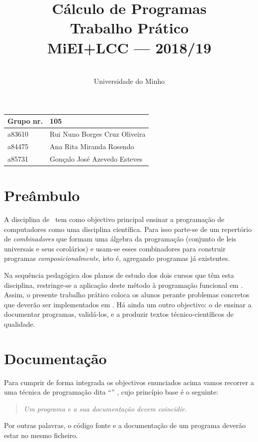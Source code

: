 \documentclass[a4paper]{article}
\title{
       	    Cálculo de Programas
\\
       	Trabalho Prático
\\
       	MiEI+LCC --- 2018/19
}
\author{
       	\dium
\\
       	Universidade do Minho
}
\date\mydate
\begin{document}
\maketitle

\begin{center}\large
\begin{tabular}{ll}
\textbf{Grupo} nr. & 105
\\\hline
a83610 & Rui Nuno Borges Cruz Oliveira	
\\
a84475 & Ana Rita Miranda Rosendo 
\\
a85731 & Gonçalo José Azevedo Esteves 
\end{tabular}
\end{center}

\section{Preâmbulo}

A disciplina de \CP\ tem como objectivo principal ensinar
a progra\-mação de computadores como uma disciplina científica. Para isso
parte-se de um repertório de \emph{combinadores} que formam uma álgebra da
programação (conjunto de leis universais e seus corolários) e usam-se esses
combinadores para construir programas \emph{composicionalmente}, isto é,
agregando programas já existentes.
  
Na sequência pedagógica dos planos de estudo dos dois cursos que têm
esta disciplina, restringe-se a aplicação deste método à programação
funcional em \Haskell. Assim, o presente trabalho prático coloca os
alunos perante problemas concretos que deverão ser implementados em
\Haskell.  Há ainda um outro objectivo: o de ensinar a documentar
programas, validá-los, e a produzir textos técnico-científicos de
qualidade.

\section{Documentação} Para cumprir de forma integrada os objectivos
enunciados acima vamos recorrer a uma técnica de programa\-ção dita
``'' \cite{Kn92}, cujo princípio base é o seguinte:
\begin{quote}\em Um programa e a sua documentação devem coincidir.
\end{quote} Por outras palavras, o código fonte e a documentação de um
programa deverão estar no mesmo ficheiro.
\end{document}
